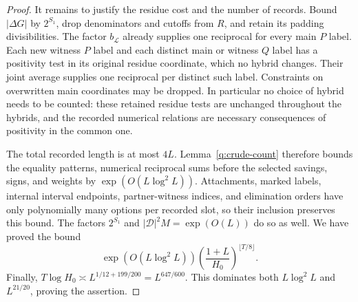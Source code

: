 \begin{proof}
It remains to justify the residue cost and the number of records.
Bound $|\Delta G|$ by $2^{S_1}$, drop denominators and cutoffs from $R$,
and retain its padding divisibilities.  The factor $b_{\mathcal L}$
already supplies one reciprocal for every main $P$ label.  Each new
witness $P$ label and each distinct main or witness $Q$ label has a
positivity test in its original residue coordinate, which no hybrid
changes.  Their joint average supplies one reciprocal per distinct
such label.  Constraints on overwritten main coordinates may be dropped.
In particular no choice of hybrid needs to be counted: these retained
residue tests are unchanged throughout the hybrids, and the recorded
numerical relations are necessary consequences of positivity in the
common one.

The total recorded length is at most $4L$.  Lemma~\ref{q:crude-count}
therefore bounds the equality patterns, numerical reciprocal sums before
the selected savings, signs, and weights by $\exp(O(L\log^2L))$.
Attachments, marked labels, internal interval endpoints, partner-witness
indices, and elimination orders have only polynomially many options per
recorded slot, so their inclusion preserves this bound.  The factors
$2^{S_1}$ and $|\mathcal D|^2M=\exp(O(L))$ do so as well.  We have
proved the bound
\[
 \exp(O(L\log^2L))
 \left(\frac{1+L}{H_0}\right)^{\lfloor T/8\rfloor}.
\]
Finally, $T\log H_0\asymp L^{1/12+199/200}=L^{647/600}$.
This dominates both $L\log^2L$ and $L^{21/20}$, proving the assertion.
\end{proof}
